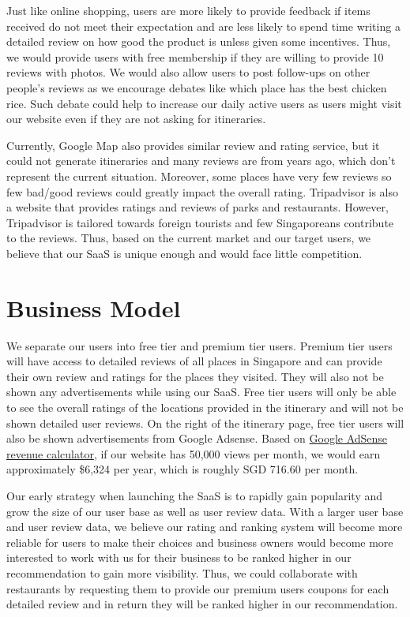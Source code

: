 \documentclass[12pt,a4paper]{article}
\begin{document}
Just like online shopping, users are more likely to provide feedback if items received do not meet their expectation and are less likely to spend time writing a detailed review on how good the product is unless given some incentives. Thus, we would provide users with free membership if they are willing to provide 10 reviews with photos. We would also allow users to post follow-ups on other people’s reviews as we encourage debates like which place has the best chicken rice. Such debate could help to increase our daily active users as users might visit our website even if they are not asking for itineraries.

Currently, Google Map also provides similar review and rating service, but it could not generate itineraries and many reviews are from years ago, which don't represent the current situation. Moreover, some places have very few reviews so few bad/good reviews could greatly impact the overall rating. Tripadvisor is also a website that provides ratings and reviews of parks and restaurants. However, Tripadvisor is tailored towards foreign tourists and few Singaporeans contribute to the reviews. Thus, based on the current market and our target users, we believe that our SaaS is unique enough and would face little competition.



\section{Business Model}

We separate our users into free tier and premium tier users. Premium tier users will have access to detailed reviews of all places in Singapore and can provide their own review and ratings for the places they visited. They will also not be shown any advertisements while using our SaaS. Free tier users will only be able to see the overall ratings of the locations provided in the itinerary and will not be shown detailed user reviews. On the right of the itinerary page, free tier users will also be shown advertisements from Google Adsense. Based on \href{https://www.google.com/adsense/start/#calculator}{Google AdSense revenue calculator}, if our website has 50,000 views per month, we would earn approximately \$6,324 per year, which is roughly SGD 716.60 per month.

Our early strategy when launching the SaaS is to rapidly gain popularity and grow the size of our user base as well as user review data. With a larger user base and user review data, we believe our rating and ranking system will become more reliable for users to make their choices and business owners would become more interested to work with us for their business to be ranked higher in our recommendation to gain more visibility. Thus, we could collaborate with restaurants by requesting them to provide our premium users coupons for each detailed review and in return they will be ranked higher in our recommendation.
\end{document}
